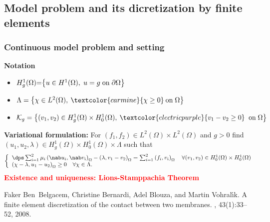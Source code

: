 \documentclass[10 pt]{beamer}
\begin{document}
\begin{frame}
\section{Model problem and its dicretization by finite elements}  
\frametitle{Continuous model problem and setting}
\textbf{Notation}
\begin{itemize}
\item $H_g^1(\Omega)\hspace{-0.1 cm} =\hspace{-0.1 cm} \left\{u\in H^1(\Omega), \hspace{0.1 cm} u=g \hspace{0.1 cm} \mbox{on} \hspace{0.1 cm} \partial \Omega\right\}$
\item $\Lambda=\left\{\chi\in L^2(\Omega), \: \textcolor{carmine}{\chi \geq 0} \: \mbox{on} \hspace{0.1 cm} \Omega\right\}$
\item
$\mathcal{K}_g= \left\{(v_1,v_2)\in H_g^1(\Omega)\times H_0^1(\Omega),\: \textcolor{electricpurple}{v_1-v_2 \geq 0} \; \; \mbox{on} 
\hspace{0.1 cm} \Omega \right\}$
\end{itemize}
\textbf{Variational formulation:}
For $(f_1,f_2)\in L^2(\Omega)\times L^2 (\Omega)$ and $g > 0$ find $(u_1,u_2,\lambda)\in H_g^1(\Omega)\times H_0^1(\Omega) \times \Lambda$ such that
\begin{equation*}
\left\lbrace\begin{array}{llccc}
\dps \sum_{i=1}^2 \mu_i \left(\nab u_i,\nab v_i\right)_{\Omega} - \left(\lambda,v_1-v_2\right)_{\Omega} = \sum_{i=1}^2\left(f_i,v_i\right)_{\Omega} \quad \forall (v_1,v_2) \in H_0^1(\Omega)\times H_0^1(\Omega) \\
\left(\chi - \lambda,u_1-u_2\right)_{\Omega} \geq 0 
\quad \forall \chi \in \Lambda.
\end{array}
\right.
\label{eq:formulation_variationnelle_probleme_initial}
\end{equation*}
\textcolor{red}{\textbf{Existence and uniqueness: Lions-Stamppachia Theorem}}
\scriptsize
\begin{thebibliography}{10}
Faker Ben~Belgacem, Christine Bernardi, Adel Blouza, and Martin
  Vohral{\'{\i}}k.
\newblock A finite element discretization of the contact between two membranes.
, 43(1):33--52, 2008.
\end{thebibliography}
\end{frame}
\end{document}
